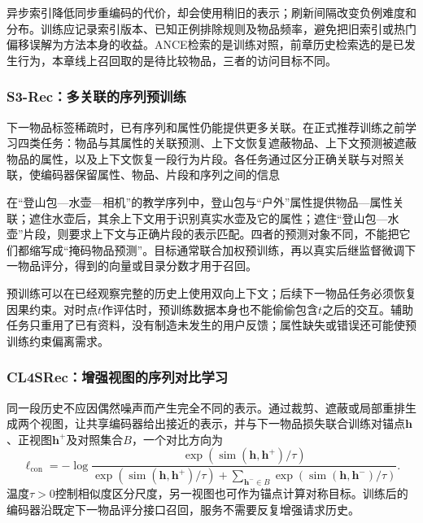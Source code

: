 异步索引降低同步重编码的代价，却会使用稍旧的表示；刷新间隔改变负例难度和分布。训练应记录索引版本、已知正例排除规则及物品频率，避免把旧索引或热门偏移误解为方法本身的收益。ANCE检索的是训练对照，前章历史检索选的是已发生行为，本章线上召回取的是待比较物品，三者的访问目标不同。

\subsubsection{S3-Rec：多关联的序列预训练}
\label{sec:rs-s3rec}

下一物品标签稀疏时，已有序列和属性仍能提供更多关联。在正式推荐训练之前学习四类任务：物品与其属性的关联预测、上下文恢复遮蔽物品、上下文预测被遮蔽物品的属性，以及上下文恢复一段行为片段。各任务通过区分正确关联与对照关联，使编码器保留属性、物品、片段和序列之间的信息

在“登山包—水壶—相机”的教学序列中，登山包与“户外”属性提供物品—属性关联；遮住水壶后，其余上下文用于识别真实水壶及它的属性；遮住“登山包—水壶”片段，则要求上下文与正确片段的表示匹配。四者的预测对象不同，不能把它们都缩写成“掩码物品预测”。目标通常联合加权预训练，再以真实后继监督微调下一物品评分，得到的向量或目录分数才用于召回。

预训练可以在已经观察完整的历史上使用双向上下文；后续下一物品任务必须恢复因果约束。对时点$t$作评估时，预训练数据本身也不能偷偷包含$t$之后的交互。辅助任务只重用了已有资料，没有制造未发生的用户反馈；属性缺失或错误还可能使预训练约束偏离需求。

\Needspace{75mm}
\subsubsection{CL4SRec：增强视图的序列对比学习}
\label{sec:rs-cl4srec}

同一段历史不应因偶然噪声而产生完全不同的表示。通过裁剪、遮蔽或局部重排生成两个视图，让共享编码器给出接近的表示，并与下一物品损失联合训练对锚点$\bm h$、正视图$\bm h^+$及对照集合$B$，一个对比方向为
\begin{equation}
 \ell_{\mathrm{con}}
 =-\log\frac{\exp(\operatorname{sim}(\bm h,\bm h^+)/\tau)}
 {\exp(\operatorname{sim}(\bm h,\bm h^+)/\tau)
    +\sum_{\bm h^-\in B}\exp(\operatorname{sim}(\bm h,\bm h^-)/\tau)}.
 \label{eq:rs-sequence-contrast}
\end{equation}
温度$\tau>0$控制相似度区分尺度，另一视图也可作为锚点计算对称目标。训练后的编码器沿既定下一物品评分接口召回，服务不需要反复增强请求历史。

